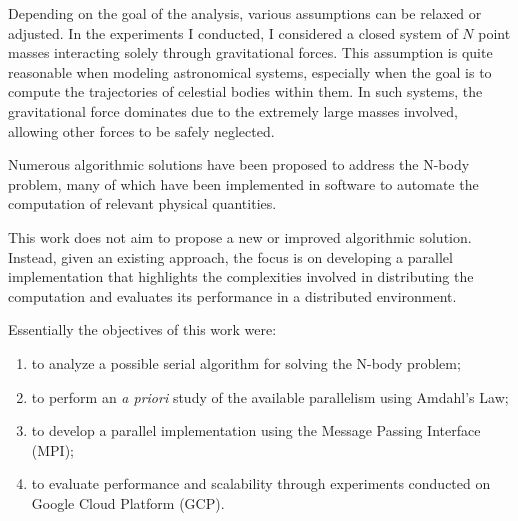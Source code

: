 \documentclass{article}
\begin{document}
Depending on the goal of the analysis, various assumptions can be relaxed or adjusted. In the experiments I conducted, I considered a closed system of $N$ point masses interacting solely through gravitational forces. This assumption is quite reasonable when modeling astronomical systems, especially when the goal is to compute the trajectories of celestial bodies within them. In such systems, the gravitational force dominates due to the extremely large masses involved, allowing other forces to be safely neglected.

Numerous algorithmic solutions have been proposed to address the N-body problem, many of which have been implemented in software to automate the computation of relevant physical quantities.

This work does not aim to propose a new or improved algorithmic solution. Instead, given an existing approach, the focus is on developing a parallel implementation that highlights the complexities involved in distributing the computation and evaluates its performance in a distributed environment.

Essentially the objectives of this work were:
\begin{enumerate}
\item to analyze a possible serial algorithm for solving the N-body problem;
\item to perform an \emph{a priori} study of the available parallelism using Amdahl's Law;
\item to develop a parallel implementation using the Message Passing Interface (MPI);
\item to evaluate performance and scalability through experiments conducted on Google Cloud Platform (GCP).
\end{enumerate}
\end{document}
